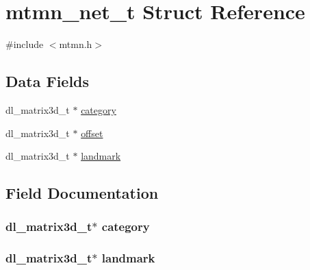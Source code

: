 \hypertarget{structmtmn__net__t}{}\section{mtmn\+\_\+net\+\_\+t Struct Reference}
\label{structmtmn__net__t}


{\ttfamily \#include $<$mtmn.\+h$>$}

\subsection*{Data Fields}
\begin{DoxyCompactItemize}
\item 
dl\+\_\+matrix3d\+\_\+t $\ast$ \hyperlink{structmtmn__net__t_a1d3531c1210c49940c846cd600b6d2f8}{category}
\item 
dl\+\_\+matrix3d\+\_\+t $\ast$ \hyperlink{structmtmn__net__t_a0903a36fc3368901a05211a31007653b}{offset}
\item 
dl\+\_\+matrix3d\+\_\+t $\ast$ \hyperlink{structmtmn__net__t_a47e72642944e5a6a519942b74c540aec}{landmark}
\end{DoxyCompactItemize}


\subsection{Field Documentation}
\subsubsection[{\texorpdfstring{category}{category}}]{\setlength{\rightskip}{0pt plus 5cm}dl\+\_\+matrix3d\+\_\+t$\ast$ category}\hypertarget{structmtmn__net__t_a1d3531c1210c49940c846cd600b6d2f8}{}\label{structmtmn__net__t_a1d3531c1210c49940c846cd600b6d2f8}
\subsubsection[{\texorpdfstring{landmark}{landmark}}]{\setlength{\rightskip}{0pt plus 5cm}dl\+\_\+matrix3d\+\_\+t$\ast$ landmark}\hypertarget{structmtmn__net__t_a47e72642944e5a6a519942b74c540aec}{}\label{structmtmn__net__t_a47e72642944e5a6a519942b74c540aec}
